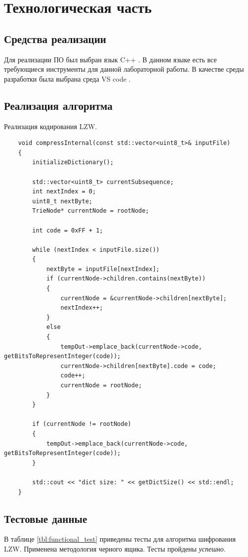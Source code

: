 \section{Технологическая часть}

\subsection{Средства реализации}

Для реализации ПО был выбран язык C++ \cite{c++}.
В данном языке есть все требующиеся инструменты для данной лабораторной работы.
В качестве среды разработки была выбрана среда VS code \cite{vscode}.

\subsection{Реализация алгоритма}

Реализация кодирования LZW.

\begin{lstlisting}
	void compressInternal(const std::vector<uint8_t>& inputFile)
	{
		initializeDictionary();

		std::vector<uint8_t> currentSubsequence;
		int nextIndex = 0;
		uint8_t nextByte;
		TrieNode* currentNode = rootNode;

		int code = 0xFF + 1;

		while (nextIndex < inputFile.size())
		{
			nextByte = inputFile[nextIndex];
			if (currentNode->children.contains(nextByte))
			{
				currentNode = &currentNode->children[nextByte];
				nextIndex++;
			}
			else
			{
				tempOut->emplace_back(currentNode->code, getBitsToRepresentInteger(code));
				currentNode->children[nextByte].code = code;
				code++;
				currentNode = rootNode;
			}
		}

		if (currentNode != rootNode)
		{
			tempOut->emplace_back(currentNode->code, getBitsToRepresentInteger(code));
		}

		std::cout << "dict size: " << getDictSize() << std::endl;
	}
\end{lstlisting}


\subsection{Тестовые данные}

В таблице \ref{tbl:functional_test} приведены тесты для алгоритма шифрования LZW. 
Применена методология черного ящика. Тесты пройдены \textit{успешно}.

